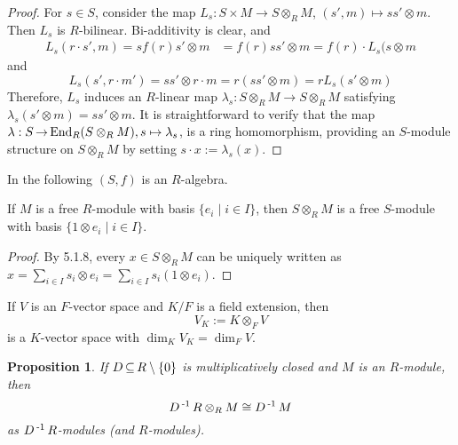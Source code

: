 \documentclass[11pt]{book}
\newcounter{counter}
\newtheorem{proposition}[counter]{Proposition}   \newtheorem{problem}[counter]{Problem}   \newtheorem*{proposition*}{Proposition}   \newtheorem*{lemma*}{Lemma}
\theoremstyle{definition}   \newtheorem{defn}[counter]{Definition} %
\newcommand{\bs}{\setminus}   \newcommand{\A}{\mathcal{A}}   \newcommand{\sy}{\textnormal{Syl}}   \newcommand{\size}[1]{\left| #1 \right|}
\DeclareMathOperator{\ra}{\rightarrow}   \DeclareMathOperator{\Poly}{\mathbf{P}}   \DeclareMathOperator{\spn}{\textnormal{span}}   \DeclareMathOperator{\aut}{\textnormal{Aut}}
\newcommand{\vs}{\vspace{8pt}}
\numberwithin{counter}{chapter}
\begin{document}
\begin{proof}
For $s \in S$, consider the map $L_s : S \times M \ra S \otimes_R M$, $(s',m) \mapsto ss' \otimes m$. Then $L_s$ is $R$-bilinear. Bi-additivity is clear, and 
\begin{align*}
L_s(r \cdot s',m) = s f(r) s' \otimes m &= f(r) ss' \otimes m = f(r) \cdot L_s(s \otimes m
\end{align*}
and
	\[L_s(s',r \cdot m') = ss' \otimes r \cdot m = r (ss' \otimes m) = r L_s(s' \otimes m) \]
Therefore, $L_s$ induces an $R$-linear map $\lambda_s : S \otimes_R M \ra S \otimes_R M$ satisfying $\lambda_s(s' \otimes m) = ss' \otimes m$. It is straightforward to verify that the map $\lambda : S \ra \tn{End}_R(S \otimes_R M), s \mapsto \lambda_s$, is a ring homomorphism, providing an $S$-module structure on $S \otimes_R M$ by setting $s \cdot x := \lambda_s(x)$. 
\end{proof}

\vs

In the following $(S,f)$ is an $R$-algebra.

\vs

\begin{corollary}
If $M$ is a free $R$-module with basis $\{e_i \mid i \in I\}$, then $S \otimes_R M$ is a free $S$-module with basis $\{1 \otimes e_i \mid i \in I\}$. 
\end{corollary}

\begin{proof}
By 5.1.8, every $x \in S \otimes_R M$ can be uniquely written as $x = \sum_{i \in I} s_i \otimes e_i = \sum_{i \in I} s_i ( 1 \otimes e_i)$. 
\end{proof}

\vs

\begin{example}
If $V$ is an $F$-vector space and $K/F$ is a field extension, then
	\[V_K := K \otimes_F V \]
is a $K$-vector space with $\dim_K V_K = \dim_F V$. 
\end{example}

\vs

\begin{proposition}
If $D \sub R \bs \{0\}$ is multiplicatively closed and $M$ is an $R$-module, then
	\[D\operatorname{^{-1}} R \otimes_R M \cong D\operatorname{^{-1}} M \]
as $D\operatorname{^{-1}} R$-modules (and $R$-modules). 
\end{proposition}
\end{document}
